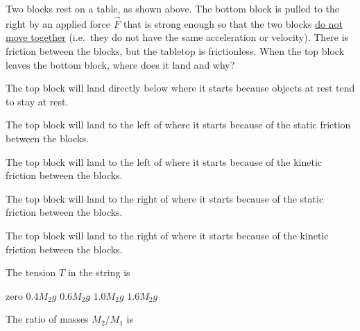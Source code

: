 \documentclass[12pt]{../../oss-apphys-exam}
\begin{document}
\begin{questions}
  \question Two blocks rest on a table, as shown above. The bottom block is
  pulled to the right by an applied force $\vec F$ that is strong enough so
  that the two blocks \underline{do not move together} (i.e.\ they do not have
  the same acceleration or velocity). There is friction between the blocks, but
  the tabletop is frictionless. When the top block leaves the bottom block,
  where does it land and why?
  \begin{choices}
    \choice The top block will land directly below where it starts because
    objects at rest tend to stay at rest.

    \choice The top block will land to the left of where it starts because of
    the static friction between the blocks.
    
    \choice The top block will land to the left of where it starts because of
    the kinetic friction between the blocks.
    
    \choice The top block will land to the right of where it starts because of
    the static friction between the blocks.
    
    \choice The top block will land to the right of where it starts because of
    the kinetic friction between the blocks.
  \end{choices}
  \newpage
  

  \question The tension $T$ in the string is \label{connect1}
  \begin{choices}
    \choice zero
    \choice $0.4M_2g$
    \choice $0.6M_2g$
    \choice $1.0M_2g$
    \choice $1.6M_2g$
  \end{choices}
  
  \question The ratio of masses $M_2/M_1$ is  \label{connect2}
  \begin{choices}
  \end{choices}
  \newpage
  

\end{questions}
\end{document}
